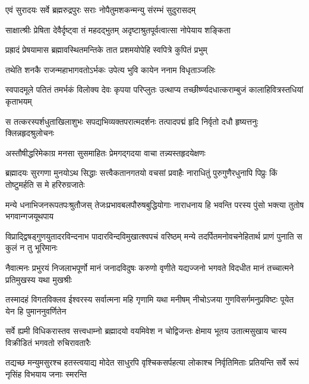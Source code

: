 

\twolineshloka
{एवं सुरादयः सर्वे ब्रह्मरुद्रपुरः सराः}
{नोपैतुमशकन्मन्यु संरम्भं सुदुरासदम्} %

\twolineshloka
{साक्षात्श्रीः प्रेषिता देवैर्दृष्ट्वा तं महदद्भुतम्}
{अदृष्टाश्रुतपूर्वत्वात्सा नोपेयाय शङ्किता} %

\twolineshloka
{प्रह्रादं प्रेषयामास ब्रह्मावस्थितमन्तिके}
{तात प्रशमयोपेहि स्वपित्रे कुपितं प्रभुम्} %

\twolineshloka
{तथेति शनकै राजन्महाभागवतोऽर्भकः}
{उपेत्य भुवि कायेन ननाम विधृताञ्जलिः} %

\twolineshloka
{स्वपादमूले पतितं तमर्भकं विलोक्य देवः कृपया परिप्लुतः}
{उत्थाप्य तच्छीर्ष्ण्यदधात्कराम्बुजं कालाहिवित्रस्तधियां कृताभयम्} %

\twolineshloka
{स तत्करस्पर्शधुताखिलाशुभः सपद्यभिव्यक्तपरात्मदर्शनः}
{तत्पादपद्मं हृदि निर्वृतो दधौ हृष्यत्तनुः क्लिन्नहृदश्रुलोचनः} %

\twolineshloka
{अस्तौषीद्धरिमेकाग्र मनसा सुसमाहितः}
{प्रेमगद्गदया वाचा तन्न्यस्तहृदयेक्षणः} %



\fourlineindentedshloka
{ब्रह्मादयः सुरगणा मुनयोऽथ सिद्धाः}
{सत्त्वैकतानगतयो वचसां प्रवाहैः}
{नाराधितुं पुरुगुणैरधुनापि पिप्रुः}
{किं तोष्टुमर्हति स मे हरिरुग्रजातेः} %

\fourlineindentedshloka
{मन्ये धनाभिजनरूपतपःश्रुतौजस्}
{तेजःप्रभावबलपौरुषबुद्धियोगाः}
{नाराधनाय हि भवन्ति परस्य पुंसो}
{भक्त्या तुतोष भगवान्गजयूथपाय} %

\fourlineindentedshloka
{विप्राद्द्विषड्गुणयुतादरविन्दनाभ}
{पादारविन्दविमुखात्श्वपचं वरिष्ठम्}
{मन्ये तदर्पितमनोवचनेहितार्थ}
{प्राणं पुनाति स कुलं न तु भूरिमानः} %

\fourlineindentedshloka
{नैवात्मनः प्रभुरयं निजलाभपूर्णो}
{मानं जनादविदुषः करुणो वृणीते}
{यद्यज्जनो भगवते विदधीत मानं}
{तच्चात्मने प्रतिमुखस्य यथा मुखश्रीः} %

\fourlineindentedshloka
{तस्मादहं विगतविक्लव ईश्वरस्य}
{सर्वात्मना महि गृणामि यथा मनीषम्}
{नीचोऽजया गुणविसर्गमनुप्रविष्टः}
{पूयेत येन हि पुमाननुवर्णितेन} %

\fourlineindentedshloka
{सर्वे ह्यमी विधिकरास्तव सत्त्वधाम्नो}
{ब्रह्मादयो वयमिवेश न चोद्विजन्तः}
{क्षेमाय भूतय उतात्मसुखाय चास्य}
{विक्रीडितं भगवतो रुचिरावतारैः} %

\fourlineindentedshloka
{तद्यच्छ मन्युमसुरश्च हतस्त्वयाद्य}
{मोदेत साधुरपि वृश्चिकसर्पहत्या}
{लोकाश्च निर्वृतिमिताः प्रतियन्ति सर्वे}
{रूपं नृसिंह विभयाय जनाः स्मरन्ति} %

